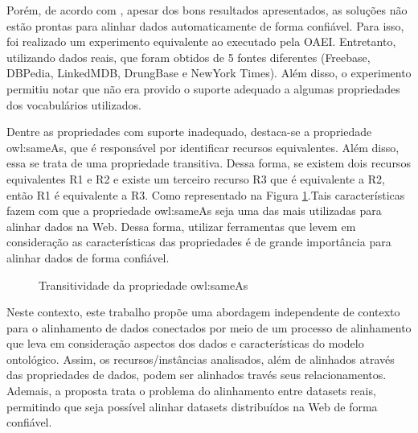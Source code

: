 Porém, de acordo com , apesar dos bons resultados apresentados, as soluções não estão prontas para alinhar dados automaticamente de forma confiável. Para isso, foi realizado um experimento equivalente ao executado pela OAEI. Entretanto, utilizando dados reais, que foram obtidos de 5 fontes diferentes (Freebase, DBPedia, LinkedMDB, DrungBase e NewYork Times). Além disso, o experimento permitiu notar que não era provido o suporte adequado a algumas propriedades dos vocabulários utilizados.
	
Dentre as propriedades com suporte inadequado, destaca-se a propriedade owl:sameAs, que é responsável por identificar recursos equivalentes. Além disso, essa se trata de uma propriedade transitiva. Dessa forma, se existem dois recursos equivalentes R1 e R2 e existe um terceiro recurso R3 que é equivalente a R2, então R1 é equivalente a R3. Como representado na Figura \ref{sameAs}.Tais características fazem com que a propriedade owl:sameAs seja uma das  mais utilizadas para alinhar dados na Web. Dessa forma, utilizar ferramentas que levem em consideração as características das propriedades é de grande importância para alinhar dados de forma confiável.

\begin{figure}[h]
\centering
{}
\caption{Transitividade da propriedade owl:sameAs}
\label{sameAs}
\end{figure}

Neste contexto, este trabalho propõe uma abordagem independente de contexto para o alinhamento de dados conectados por meio de um processo de alinhamento que leva em consideração aspectos dos dados e  características do modelo ontológico. Assim, os recursos/instâncias analisados, além de alinhados através das propriedades de dados, podem ser alinhados través seus relacionamentos. Ademais, a proposta trata o problema do alinhamento entre datasets reais, permitindo que seja possível alinhar datasets distribuídos na Web de forma confiável.
